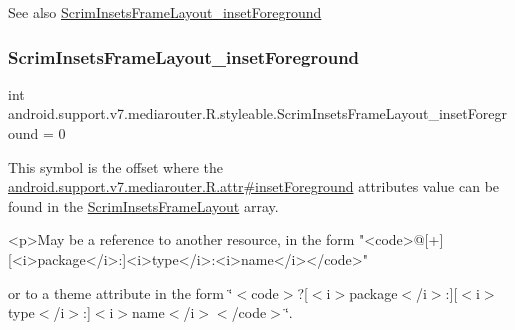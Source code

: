 \begin{DoxySeeAlso}{See also}
\hyperlink{classandroid_1_1support_1_1v7_1_1mediarouter_1_1R_1_1styleable_a6f1d08520fe410acc8fe81b3629cf4b2}{Scrim\+Insets\+Frame\+Layout\+\_\+inset\+Foreground} 
\end{DoxySeeAlso}
\mbox{\label{classandroid_1_1support_1_1v7_1_1mediarouter_1_1R_1_1styleable_a6f1d08520fe410acc8fe81b3629cf4b2}} 
\subsubsection{\texorpdfstring{Scrim\+Insets\+Frame\+Layout\+\_\+inset\+Foreground}{ScrimInsetsFrameLayout\_insetForeground}}
{\footnotesize\ttfamily int android.\+support.\+v7.\+mediarouter.\+R.\+styleable.\+Scrim\+Insets\+Frame\+Layout\+\_\+inset\+Foreground = 0\hspace{0.3cm}{\ttfamily [static]}}

This symbol is the offset where the \hyperlink{classandroid_1_1support_1_1v7_1_1mediarouter_1_1R_1_1attr_af9a8fe8a5b13e9eca1b11e8bcfbb2b6c}{android.\+support.\+v7.\+mediarouter.\+R.\+attr\#inset\+Foreground} attribute\textquotesingle{}s value can be found in the \hyperlink{classandroid_1_1support_1_1v7_1_1mediarouter_1_1R_1_1styleable_a0a27a56a35bdde444bae418bd7fdc71d}{Scrim\+Insets\+Frame\+Layout} array.

\begin{DoxyVerb}      <p>May be a reference to another resource, in the form "<code>@[+][<i>package</i>:]<i>type</i>:<i>name</i></code>"
\end{DoxyVerb}
 or to a theme attribute in the form \char`\"{}$<$code$>$?\mbox{[}$<$i$>$package$<$/i$>$\+:\mbox{]}\mbox{[}$<$i$>$type$<$/i$>$\+:\mbox{]}$<$i$>$name$<$/i$>$$<$/code$>$\char`\"{}. 


